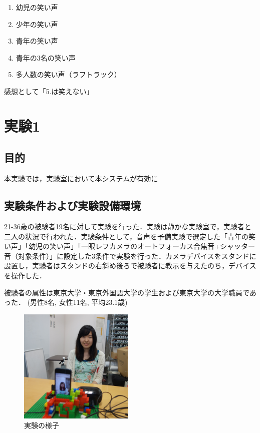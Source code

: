 \documentclass[submit,techreq]{ec2014}
\begin{document}
\begin{enumerate}
 \item 幼児の笑い声
 \item 少年の笑い声
 \item 青年の笑い声
 \item 青年の3名の笑い声
 \item 多人数の笑い声（ラフトラック）
\end{enumerate}

感想として「5.は笑えない」

\section{実験1}
\subsection{目的}

本実験では，実験室において本システムが有効に

\subsection{実験条件および実験設備環境}

21-36歳の被験者19名に対して実験を行った．実験は静かな実験室で，実験者と二人の状況で行われた．実験条件として，音声を予備実験で選定した「青年の笑い声」「幼児の笑い声」「一眼レフカメラのオートフォーカス合焦音+シャッター音（対象条件）」に設定した3条件で実験を行った．カメラデバイスをスタンドに設置し，実験者はスタンドの右斜め後ろで被験者に教示を与えたのち，デバイスを操作した．

被験者の属性は東京大学・東京外国語大学の学生および東京大学の大学職員であった． (男性8名, 女性11名, 平均23.1歳) 

\begin{figure}[h!]
  \centering  
\includegraphics[width=55mm, bb=0 0 2312 2312]{images/DSC05173.jpg}
\caption{実験の様子}
  \label{recursive}
\end{figure}
\end{document}
